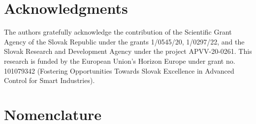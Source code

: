 \documentclass[preprint,12pt]{elsarticle}
\begin{document}
	\section*{Acknowledgments}
	
	The authors gratefully acknowledge the contribution of the Scientific Grant Agency of the Slovak Republic under the grants 1/0545/20, 1/0297/22, and the Slovak Research and Development Agency under the project APVV-20-0261. 
	This research is funded by the European Union’s Horizon Europe under grant no. 101079342 (Fostering Opportunities Towards Slovak Excellence in Advanced Control for Smart Industries). 
	
	\section*{Nomenclature}
	
\end{document}
